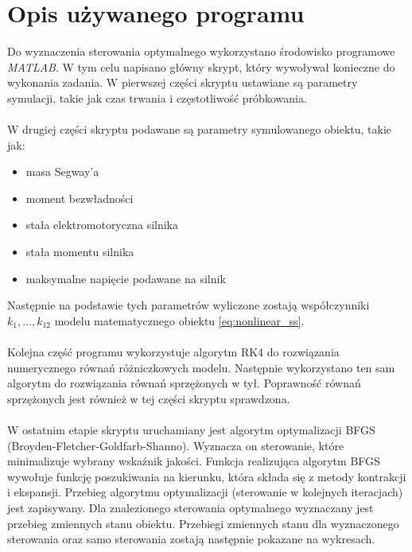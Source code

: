 \section{Opis używanego programu}
\label{sec:opis_uzywanego_programu}

Do wyznaczenia sterowania optymalnego wykorzystano środowisko programowe \textit{MATLAB}. W tym celu napisano główny skrypt, który wywoływał konieczne do wykonania zadania. W pierwszej części skryptu ustawiane są parametry symulacji, takie jak czas trwania i częstotliwość próbkowania.
\paragraph*{}
W drugiej części skryptu podawane są parametry symulowanego obiektu, takie jak:
\begin{itemize}
\item masa Segway'a
\item moment bezwładności
\item stała elektromotoryczna silnika
\item stała momentu silnika
\item maksymalne napięcie podawane na silnik
\end{itemize}
Następnie na podstawie tych parametrów wyliczone zostają współczynniki \(k_1,\dots,k_{12}\) modelu matematycznego obiektu \eqref{eq:nonlinear_ss}.
\paragraph*{}
Kolejna część programu wykorzystuje algorytm RK4 do rozwiązania numerycznego równań różniczkowych modelu. Następnie wykorzystano ten sam algorytm do rozwiązania równań sprzężonych w tył. Poprawność równań sprzężonych jest również w tej części skryptu sprawdzona.
\paragraph*{}
W ostatnim etapie skryptu uruchamiany jest algorytm optymalizacji BFGS (Broyden-Fletcher-Goldfarb-Shanno). Wyznacza on sterowanie, które minimalizuje wybrany wskaźnik jakości. Funkcja realizująca algorytm BFGS wywołuje funkcję poszukiwania na kierunku, która składa się z metody kontrakcji i ekspansji. Przebieg algorytmu optymalizacji (sterowanie w kolejnych iteracjach) jest zapisywany. Dla znalezionego sterowania optymalnego wyznaczany jest przebieg zmiennych stanu obiektu. Przebiegi zmiennych stanu dla wyznaczonego sterowania oraz samo sterowania zostają następnie pokazane na wykresach.